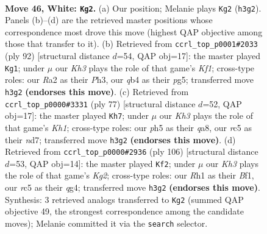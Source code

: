 \documentclass[11pt]{article}
\begin{document}
\clearpage

\begin{figure}[p]\centering
\begin{subfigure}{0.46\textwidth}\centering
\resizebox{\linewidth}{!}{%
\newchessgame
\chessboard[
  setfen={3Q1nk1/1p5p/8/2r4p/1q6/6NK/R7/7R w - - 4 46},
  showmover=false,
  pgfstyle=straightmove, color=movearrow, markmove={h3-g2}
]}
\caption{}
\end{subfigure}\hfill
\begin{subfigure}{0.46\textwidth}\centering
\resizebox{\linewidth}{!}{%
\newchessgame
\chessboard[
  setfen={8/1p1r1p1Q/2q2k2/6p1/8/7P/6P1/4RK2 w - - 4 47},
  showmover=false,
  pgfstyle=straightmove, color=movearrow, markmove={f1-g1}
]}
\caption{}
\end{subfigure}
\\[4pt]
\begin{subfigure}{0.46\textwidth}\centering
\resizebox{\linewidth}{!}{%
\newchessgame
\chessboard[
  setfen={Q6k/3N2p1/7p/8/8/P6P/5qPK/2r5 b - - 9 39},
  showmover=false,
  pgfstyle=straightmove, color=movearrow, markmove={h8-h7}
]}
\caption{}
\end{subfigure}\hfill
\begin{subfigure}{0.46\textwidth}\centering
\resizebox{\linewidth}{!}{%
\newchessgame
\chessboard[
  setfen={2Q5/2Pn1pk1/2R3p1/3pp3/6q1/8/6K1/5B2 w - - 0 54},
  showmover=false,
  pgfstyle=straightmove, color=movearrow, markmove={g2-f2}
]}
\caption{}
\end{subfigure}
\caption{\textbf{Move 46, White: \texttt{Kg2}.} (a) Our position; Melanie plays \texttt{Kg2} (\texttt{h3g2}). Panels (b)--(d) are the retrieved master positions whose correspondence most drove this move (highest QAP objective among those that transfer to it). (b) Retrieved from \texttt{ccrl\_top\_p0001\#2033} (ply 92) [structural distance $d$=54, QAP obj=17]: the master played \texttt{Kg1}; under $\mu$ our \emph{Kh3} plays the role of that game's \emph{Kf1}; cross-type roles: our \emph{R}a2 as their \emph{P}h3, our \emph{q}b4 as their \emph{p}g5; transferred move \texttt{h3g2} \textbf{(endorses this move)}. (c) Retrieved from \texttt{ccrl\_top\_p0000\#3331} (ply 77) [structural distance $d$=52, QAP obj=17]: the master played \texttt{Kh7}; under $\mu$ our \emph{Kh3} plays the role of that game's \emph{Kh1}; cross-type roles: our \emph{p}h5 as their \emph{q}a8, our \emph{r}c5 as their \emph{n}d7; transferred move \texttt{h3g2} \textbf{(endorses this move)}. (d) Retrieved from \texttt{ccrl\_top\_p0000\#2936} (ply 106) [structural distance $d$=53, QAP obj=14]: the master played \texttt{Kf2}; under $\mu$ our \emph{Kh3} plays the role of that game's \emph{Kg2}; cross-type roles: our \emph{R}h1 as their \emph{B}f1, our \emph{r}c5 as their \emph{q}g4; transferred move \texttt{h3g2} \textbf{(endorses this move)}. Synthesis: 3 retrieved analogs transferred to \texttt{Kg2} (summed QAP objective 49, the strongest correspondence among the candidate moves); Melanie committed it via the \texttt{search} selector.}
\label{fig:thought-m90}
\end{figure}
\end{document}
